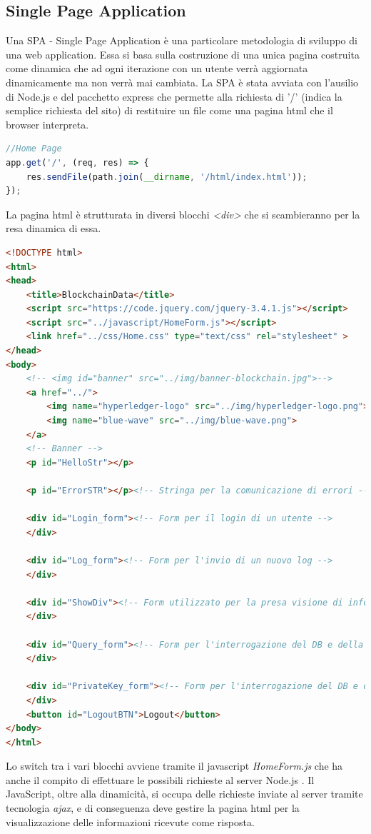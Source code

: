 \documentclass[11pt,a4paper,titlepage]{report}
\begin{document}
\subsection{Single Page Application}%
Una SPA - Single Page Application è una particolare metodologia di sviluppo di una web application. Essa si basa sulla costruzione di una unica pagina costruita come dinamica che ad ogni iterazione con un utente verrà aggiornata dinamicamente ma non verrà mai cambiata. La SPA è stata avviata con l'ausilio di Node.js e del pacchetto express che permette alla richiesta di '/' (indica la semplice richiesta del sito) di restituire un file come una pagina html che il browser interpreta.
\begin{lstlisting}[language=JavaScript]
//Home Page
app.get('/', (req, res) => {
  	res.sendFile(path.join(__dirname, '/html/index.html'));
});
\end{lstlisting}
La pagina html è strutturata in diversi blocchi \textit{<div>} che si scambieranno per la resa dinamica di essa.
\begin{lstlisting}[language=HTML]
<!DOCTYPE html>
<html>
<head>
	<title>BlockchainData</title>
	<script src="https://code.jquery.com/jquery-3.4.1.js"></script>
	<script src="../javascript/HomeForm.js"></script>
	<link href="../css/Home.css" type="text/css" rel="stylesheet" >
</head>
<body>
	<!-- <img id="banner" src="../img/banner-blockchain.jpg">-->
	<a href="../">
		<img name="hyperledger-logo" src="../img/hyperledger-logo.png">
		<img name="blue-wave" src="../img/blue-wave.png">
	</a>
	<!-- Banner -->
	<p id="HelloStr"></p>

	<p id="ErrorSTR"></p><!-- Stringa per la comunicazione di errori -->
	
	<div id="Login_form"><!-- Form per il login di un utente -->
	</div>
	
	<div id="Log_form"><!-- Form per l'invio di un nuovo log -->
	</div>

	<div id="ShowDiv"><!-- Form utilizzato per la presa visione di informazioni -->
	</div>

	<div id="Query_form"><!-- Form per l'interrogazione del DB e della Blockchain -->
	</div>

	<div id="PrivateKey_form"><!-- Form per l'interrogazione del DB e della Blockchain -->
	</div>
	<button id="LogoutBTN">Logout</button>
</body>
</html>
\end{lstlisting}
Lo switch tra i vari blocchi avviene tramite il javascript \textit{HomeForm.js} che ha anche il compito di effettuare le possibili richieste al server Node.js . Il JavaScript, oltre alla dinamicità, si occupa delle richieste inviate al server tramite tecnologia \textit{ajax}, e di conseguenza deve gestire la pagina html per la visualizzazione delle informazioni ricevute come risposta.
\end{document}
